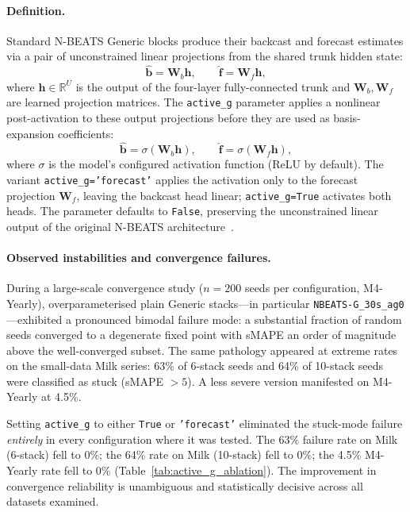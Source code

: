 \documentclass[11pt,a4paper]{article}
\begin{document}
\paragraph{Definition.}
Standard N-BEATS Generic blocks produce their backcast and forecast estimates via a pair of unconstrained linear projections from the shared trunk hidden state:
\[
  \hat{\mathbf{b}} = \mathbf{W}_b \mathbf{h}, \qquad \hat{\mathbf{f}} = \mathbf{W}_f \mathbf{h},
\]
where $\mathbf{h} \in \mathbb{R}^U$ is the output of the four-layer fully-connected trunk and $\mathbf{W}_b, \mathbf{W}_f$ are learned projection matrices. The \texttt{active\_g} parameter applies a nonlinear post-activation to these output projections before they are used as basis-expansion coefficients:
\[
  \hat{\mathbf{b}} = \sigma(\mathbf{W}_b \mathbf{h}), \qquad \hat{\mathbf{f}} = \sigma(\mathbf{W}_f \mathbf{h}),
\]
where $\sigma$ is the model's configured activation function (ReLU by default). The variant \texttt{active\_g='forecast'} applies the activation only to the forecast projection $\mathbf{W}_f$, leaving the backcast head linear; \texttt{active\_g=True} activates both heads. The parameter defaults to \texttt{False}, preserving the unconstrained linear output of the original N-BEATS architecture~\citep{oreshkin2020nbeats}.

\paragraph{Observed instabilities and convergence failures.}
During a large-scale convergence study ($n = 200$ seeds per configuration, M4-Yearly), overparameterised plain Generic stacks---in particular \texttt{NBEATS-G\_30s\_ag0}---exhibited a pronounced bimodal failure mode: a substantial fraction of random seeds converged to a degenerate fixed point with sMAPE an order of magnitude above the well-converged subset. The same pathology appeared at extreme rates on the small-data Milk series: 63\% of 6-stack seeds and 64\% of 10-stack seeds were classified as stuck (sMAPE $> 5$). A less severe version manifested on M4-Yearly at 4.5\%.

Setting \texttt{active\_g} to either \texttt{True} or \texttt{'forecast'} eliminated the stuck-mode failure \emph{entirely} in every configuration where it was tested. The 63\% failure rate on Milk (6-stack) fell to 0\%; the 64\% rate on Milk (10-stack) fell to 0\%; the 4.5\% M4-Yearly rate fell to 0\% (Table~\ref{tab:active_g_ablation}). The improvement in convergence reliability is unambiguous and statistically decisive across all datasets examined.
\end{document}
